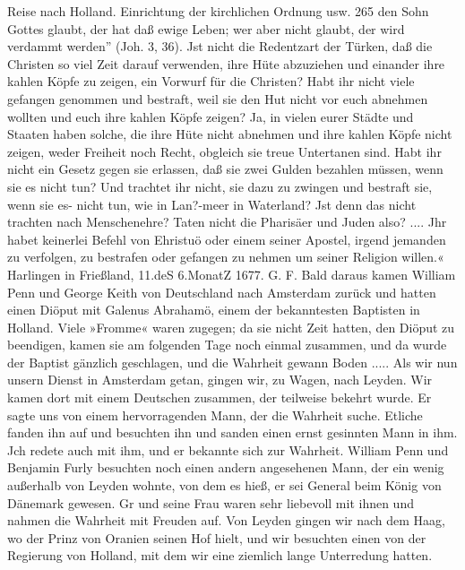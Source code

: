 Reise nach Holland. Einrichtung der kirchlichen Ordnung usw. 265
den Sohn Gottes glaubt, der hat daß ewige Leben; wer aber
nicht glaubt, der wird verdammt werden'' (Joh. 3, 36). Jst
nicht die Redentzart der Türken, daß die Christen so viel Zeit
darauf verwenden, ihre Hüte abzuziehen und einander ihre kahlen
Köpfe zu zeigen, ein Vorwurf für die Christen? Habt ihr nicht
viele gefangen genommen und bestraft, weil sie den Hut nicht vor
euch abnehmen wollten und euch ihre kahlen Köpfe zeigen? Ja,
in vielen eurer Städte und Staaten haben solche, die ihre Hüte
nicht abnehmen und ihre kahlen Köpfe nicht zeigen, weder Freiheit
noch Recht, obgleich sie treue Untertanen sind. Habt ihr nicht
ein Gesetz gegen sie erlassen, daß sie zwei Gulden bezahlen müssen,
wenn sie es nicht tun? Und trachtet ihr nicht, sie dazu zu zwingen
und bestraft sie, wenn sie es- nicht tun, wie in Lan?-meer in
Waterland? Jst denn das nicht trachten nach Menschenehre?
Taten nicht die Pharisäer und Juden also? ....
Jhr habet keinerlei Befehl von Ehristuö oder einem seiner
Apostel, irgend jemanden zu verfolgen, zu bestrafen oder gefangen
zu nehmen um seiner Religion willen.«
Harlingen in Frießland, 11.deS 6.MonatZ 1677. G. F.
Bald daraus kamen William Penn und George Keith von
Deutschland nach Amsterdam zurück und hatten einen Diöput mit
Galenus Abrahamö, einem der bekanntesten Baptisten in Holland.
Viele »Fromme« waren zugegen; da sie nicht Zeit hatten, den
Diöput zu beendigen, kamen sie am folgenden Tage noch einmal
zusammen, und da wurde der Baptist gänzlich geschlagen, und die
Wahrheit gewann Boden ..... Als wir nun unsern Dienst in
Amsterdam getan, gingen wir, zu Wagen, nach Leyden. Wir
kamen dort mit einem Deutschen zusammen, der teilweise bekehrt
wurde. Er sagte uns von einem hervorragenden Mann, der die
Wahrheit suche. Etliche fanden ihn auf und besuchten ihn und
sanden einen ernst gesinnten Mann in ihm. Jch redete auch mit
ihm, und er bekannte sich zur Wahrheit. William Penn und Benjamin
Furly besuchten noch einen andern angesehenen Mann, der ein wenig
außerhalb von Leyden wohnte, von dem es hieß, er sei General
beim König von Dänemark gewesen. Gr und seine Frau waren
sehr liebevoll mit ihnen und nahmen die Wahrheit mit Freuden auf.
Von Leyden gingen wir nach dem Haag, wo der Prinz von
Oranien seinen Hof hielt, und wir besuchten einen von der Regierung
von Holland, mit dem wir eine ziemlich lange Unterredung hatten.


